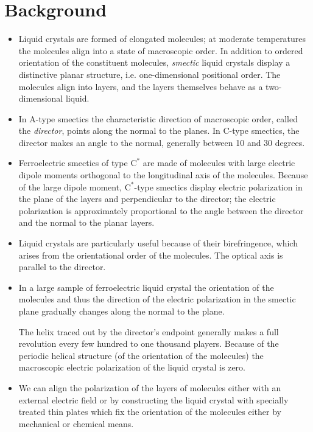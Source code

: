 \documentclass[11pt, a4paper]{article}
\begin{document}
\appendix
\section{Background}
\begin{itemize}
	\item Liquid crystals are formed of elongated molecules; at moderate temperatures the molecules align into a state of macroscopic order. In addition to ordered orientation of the constituent molecules, \textit{smectic} liquid crystals display a distinctive planar structure, i.e. one-dimensional positional order. The molecules align into layers, and the layers themselves behave as a two-dimensional liquid. 
	
	\item In A-type smectics the characteristic direction of macroscopic order, called the \textit{director}, points along the normal to the planes. In C-type smectics, the director makes an angle to the normal, generally between 10 and 30 degrees. 
	
	\item Ferroelectric smectics of type $ \mathrm{C}^{*} $ are made of molecules with large electric dipole moments orthogonal to the longitudinal axis of the molecules. Because of the large dipole moment, $ \mathrm{C}^{*} $-type smectics display electric polarization in the plane of the layers and perpendicular to the director; the electric polarization is approximately proportional to the angle between the director and the normal to the planar layers.
	
	\item Liquid crystals are particularly useful because of their birefringence, which arises from the orientational order of the molecules. The optical axis is parallel to the director.
	
	\item In a large sample of ferroelectric liquid crystal the orientation of the molecules and thus the direction of the electric polarization in the smectic plane gradually changes along the normal to the plane. 
	
	The helix traced out by the director's endpoint generally makes a full revolution every few hundred to one thousand players. Because of the periodic helical structure (of the orientation of the molecules) the macroscopic electric polarization of the liquid crystal is zero.
	
	\item We can align the polarization of the layers of molecules either with an external electric field or by constructing the liquid crystal with specially treated thin plates which fix the orientation of the molecules either by mechanical or chemical means.
	

\end{itemize}
\end{document}
